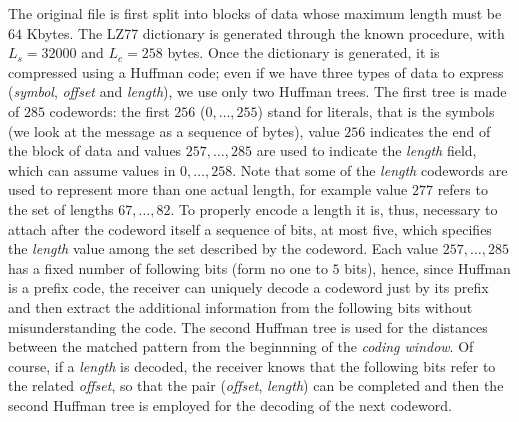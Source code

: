 The original file is first split into blocks of data whose maximum length must be $64$ Kbytes. The LZ77 dictionary is generated through the known procedure, with $L_s = 32000$ and $L_c = 258$ bytes. Once the dictionary is generated, it is compressed using a Huffman code; even if we have three types of data to express (\textit{symbol}, \textit{offset} and \textit{length}), we use only two Huffman trees. The first tree is made of $285$ codewords: the first $256$ ($0, \ldots, 255$) stand for literals, that is the symbols (we look at the message as a sequence of bytes), value $256$ indicates the end of the block of data and values $257, \ldots, 285$ are used to indicate the \textit{length} field, which can assume values in $0, \ldots, 258$. Note that some of the \textit{length} codewords are used to represent more than one actual length, for example value $277$ refers to the set of lengths $67, \ldots, 82$. To properly encode a length it is, thus, necessary to attach after the codeword itself a sequence of bits, at most five, which specifies the \textit{length} value among the set described by the codeword. Each value $257, \ldots, 285$ has a fixed number of following bits (form no one to $5$ bits), hence, since Huffman is a prefix code, the receiver can uniquely decode a codeword just by its prefix and then extract the additional information from the following bits without misunderstanding the code. The second Huffman tree is used for the distances between the matched pattern from the beginnning of the \textit{coding window}. Of course, if a \textit{length} is decoded, the receiver knows that the following bits refer to the related \textit{offset}, so that the pair (\textit{offset}, \textit{length}) can be completed and then the second Huffman tree is employed for the decoding of the next codeword.

